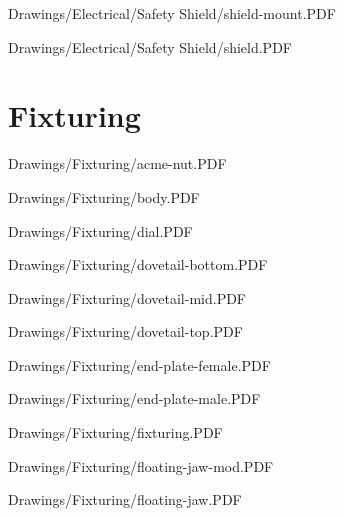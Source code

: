 
{Drawings/Electrical/Safety Shield/shield-mount.PDF}


{Drawings/Electrical/Safety Shield/shield.PDF}

\section{Fixturing}


{Drawings/Fixturing/acme-nut.PDF}


{Drawings/Fixturing/body.PDF}


{Drawings/Fixturing/dial.PDF}


{Drawings/Fixturing/dovetail-bottom.PDF}


{Drawings/Fixturing/dovetail-mid.PDF}


{Drawings/Fixturing/dovetail-top.PDF}


{Drawings/Fixturing/end-plate-female.PDF}


{Drawings/Fixturing/end-plate-male.PDF}


{Drawings/Fixturing/fixturing.PDF}


{Drawings/Fixturing/floating-jaw-mod.PDF}


{Drawings/Fixturing/floating-jaw.PDF}

